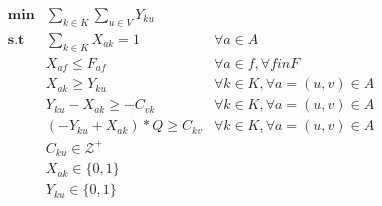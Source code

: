 \begin{align*}
    \mathbf{min} &\sum_{k\in K} \sum_{u \in V} {Y_{ku}} \\
   \mathbf{s.t}  &\sum_{k \in K}{X_{ak}=1} & \forall a \in A\\
        &X_{af} \leq F_{af} & \forall a \in f, \forall f in F \\
        &X_{ak} \geq Y_{ku} & \forall k \in K, \forall a = (u,v) \in A \\
        &Y_{ku} - X_{ak} \geq -C_{vk} & \forall k \in K, \forall a = (u,v) \in A \\
        &(-Y_{ku} + X_{ak}) * Q \geq C_{kv} & \forall k \in K, \forall a = (u,v) \in A \\
        &C_{ku} \in \mathcal{Z^+} \\
        &X_{ak} \in \{0,1\} \\
        &Y_{ku} \in \{0,1\}
\end{align*}